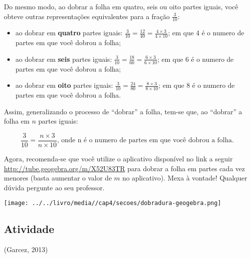 \documentclass[a4,12pt]{book}
\begin{document}
\begin{refletindo*}
Do mesmo modo, ao dobrar a folha em quatro, seis ou oito partes iguais, você obteve outras representações equivalentes para a fração $\frac{3}{10}$:
\begin{itemize} %
  \item     ao dobrar em     {\bf quatro}     partes iguais:     $\frac{3}{10} = \frac{12}{40} = \frac{4 \times 3}{4 \times 10}$; em que 4 é o numero de partes em que você dobrou a folha;
  \item     ao dobrar em     {\bf seis}     partes iguais:     $\frac{3}{10} = \frac{18}{60} = \frac{6 \times 3}{6 \times 10}$; em que 6 é o numero de partes em que você dobrou a folha;
  \item     ao dobrar em     {\bf oito}     partes iguais:     $\frac{3}{10} = \frac{24}{80} = \frac{8 \times 3}{8 \times 10}$; em que 8 é o numero de partes em que você dobrou a folha.
\end{itemize} %


Assim, generalizando o processo de ``dobrar'' a folha, tem-se que, ao ``dobrar'' a folha em $n$ partes iguais:

$$\dfrac{3}{10}=\dfrac{n \times 3}{n \times 10}\text{, onde n é o numero de partes em que você dobrou a folha.}$$

Agora, recomenda-se que você utilize o aplicativo disponível no link a seguir \url{http://tube.geogebra.org/m/X52U83TR} para dobrar a folha em partes cada vez menores (basta aumentar o valor de $m$ no aplicativo). Mexa à vontade! Qualquer dúvida pergunte ao seu professor.
\begin{center}
\texttt{[image: ../../livro/media//cap4/secoes/dobradura-geogebra.png]}
\end{center}
\end{refletindo*}


\subsection{Atividade}

(Garcez, 2013)
\end{document}
